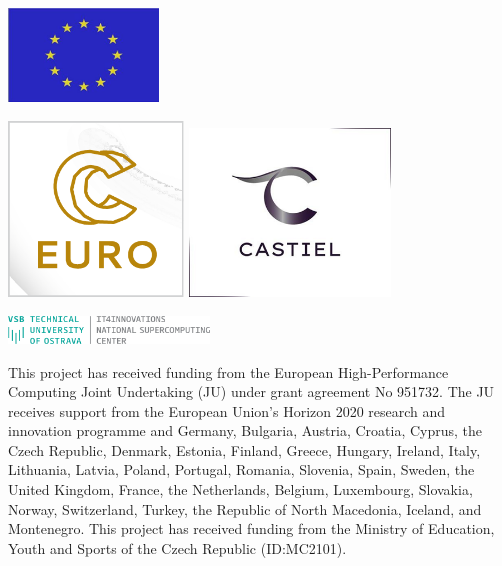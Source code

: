 \documentclass[
]{article}
\begin{document}
\begin{center}

  \includegraphics[width=0.3\textwidth]{media/image1.jpeg}

  \bigskip \bigskip \bigskip \bigskip \bigskip 

  \includegraphics[width=0.35\textwidth]{media/image2.png}
  \qquad \qquad
  \includegraphics[width=0.4\textwidth]{media/image3.png}

  \bigskip \bigskip \bigskip \bigskip \bigskip 

  \includegraphics[width=0.4\textwidth]{media/image4.png}

  \bigskip \bigskip

This project has received funding from the European High-Performance Computing Joint Undertaking (JU) under grant agreement No 951732. The JU receives support from the European Union’s Horizon 2020 research and innovation programme and Germany, Bulgaria, Austria, Croatia, Cyprus, the Czech Republic, Denmark, Estonia, Finland, Greece, Hungary, Ireland, Italy, Lithuania, Latvia, Poland, Portugal, Romania, Slovenia, Spain, Sweden, the United Kingdom, France, the Netherlands, Belgium, Luxembourg, Slovakia, Norway, Switzerland, Turkey, the Republic of North Macedonia, Iceland, and Montenegro. This project has received funding from the Ministry of Education, Youth and Sports of the Czech Republic (ID:MC2101).

\end{center}
\end{document}
